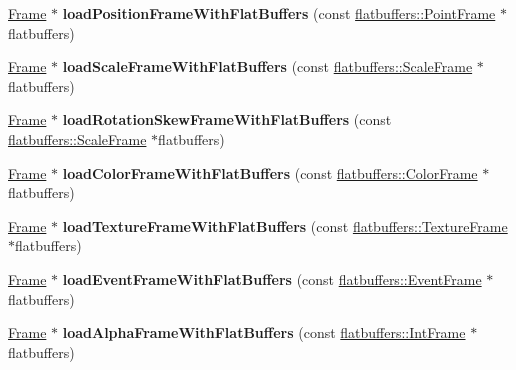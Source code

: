 \begin{DoxyCompactItemize}
\hyperlink{structflatbuffers_1_1Frame}{Frame} $\ast$ {\bfseries load\+Position\+Frame\+With\+Flat\+Buffers} (const \hyperlink{structflatbuffers_1_1PointFrame}{flatbuffers\+::\+Point\+Frame} $\ast$flatbuffers)
\item 
\mbox{\label{classActionTimelineCache_a5b125bde79e98f6fea846bfa895fadec}} 
\hyperlink{structflatbuffers_1_1Frame}{Frame} $\ast$ {\bfseries load\+Scale\+Frame\+With\+Flat\+Buffers} (const \hyperlink{structflatbuffers_1_1ScaleFrame}{flatbuffers\+::\+Scale\+Frame} $\ast$flatbuffers)
\item 
\mbox{\label{classActionTimelineCache_a23940810c0f9e759279b81d45c5dcac4}} 
\hyperlink{structflatbuffers_1_1Frame}{Frame} $\ast$ {\bfseries load\+Rotation\+Skew\+Frame\+With\+Flat\+Buffers} (const \hyperlink{structflatbuffers_1_1ScaleFrame}{flatbuffers\+::\+Scale\+Frame} $\ast$flatbuffers)
\item 
\mbox{\label{classActionTimelineCache_af314c47739d232af9178fc347609864b}} 
\hyperlink{structflatbuffers_1_1Frame}{Frame} $\ast$ {\bfseries load\+Color\+Frame\+With\+Flat\+Buffers} (const \hyperlink{structflatbuffers_1_1ColorFrame}{flatbuffers\+::\+Color\+Frame} $\ast$flatbuffers)
\item 
\mbox{\label{classActionTimelineCache_a07a6cee2ded82d7399a782e288ca0e95}} 
\hyperlink{structflatbuffers_1_1Frame}{Frame} $\ast$ {\bfseries load\+Texture\+Frame\+With\+Flat\+Buffers} (const \hyperlink{structflatbuffers_1_1TextureFrame}{flatbuffers\+::\+Texture\+Frame} $\ast$flatbuffers)
\item 
\mbox{\label{classActionTimelineCache_a93ccf6251826dd48d71ccd51f82efb34}} 
\hyperlink{structflatbuffers_1_1Frame}{Frame} $\ast$ {\bfseries load\+Event\+Frame\+With\+Flat\+Buffers} (const \hyperlink{structflatbuffers_1_1EventFrame}{flatbuffers\+::\+Event\+Frame} $\ast$flatbuffers)
\item 
\mbox{\label{classActionTimelineCache_acf9ab895933abb3dbcbc840291f5bd62}} 
\hyperlink{structflatbuffers_1_1Frame}{Frame} $\ast$ {\bfseries load\+Alpha\+Frame\+With\+Flat\+Buffers} (const \hyperlink{structflatbuffers_1_1IntFrame}{flatbuffers\+::\+Int\+Frame} $\ast$flatbuffers)

\end{DoxyCompactItemize}

